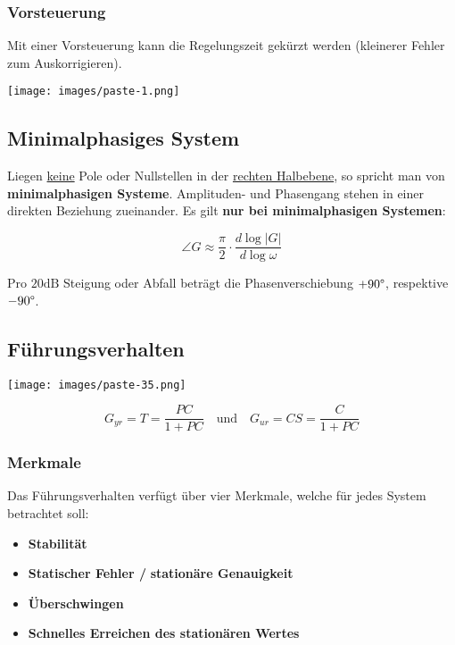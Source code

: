 \documentclass[
  10pt,
  a4paper,
  twocolumn]{article}
\providecommand{\tightlist}{%
  \setlength{\itemsep}{0pt}\setlength{\parskip}{0pt}}\usepackage{longtable,booktabs,array}
\numberwithin{equation}{section}
\begin{document}
\subsubsection{Vorsteuerung}\label{vorsteuerung}

Mit einer Vorsteuerung kann die Regelungszeit gekürzt werden (kleinerer
Fehler zum Auskorrigieren).

\texttt{[image: images/paste-1.png]}

\subsection{Minimalphasiges System}\label{minimalphasiges-system}

Liegen \ul{keine} Pole oder Nullstellen in der \ul{rechten Halbebene},
so spricht man von \textbf{minimalphasigen Systeme}. Amplituden- und
Phasengang stehen in einer direkten Beziehung zueinander. Es gilt
\textbf{nur bei minimalphasigen Systemen}:

\[
\angle{G}\approx\frac{\pi}{2}\cdot\frac{d{\log\lvert G\rvert}}{d{\log{\omega}}}
\]

Pro \(20\text{dB}\) Steigung oder Abfall beträgt die Phasenverschiebung
\(+90\degree\), respektive \(-90\degree\).

\subsection{Führungsverhalten}\label{fuxfchrungsverhalten}

\texttt{[image: images/paste-35.png]}

\[
G_{yr}=T=\frac{PC}{1+PC}\quad\text{und}\quad G_{ur}=CS=\frac{C}{1+PC}
\]

\subsubsection{Merkmale}\label{merkmale}

Das Führungsverhalten verfügt über vier Merkmale, welche für jedes
System betrachtet soll:

\begin{itemize}
\tightlist
\item
  \textbf{Stabilität}
\item
  \textbf{Statischer Fehler /} \textbf{stationäre Genauigkeit}
\item
  \textbf{Überschwingen}
\item
  \textbf{Schnelles Erreichen des stationären Wertes}
\end{itemize}
\end{document}
